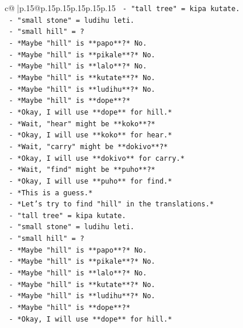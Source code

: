 \documentclass{article}
\begin{document}
{\begin{supertabular}{c@{$\;$}|p{.15\linewidth}@{}p{.15\linewidth}p{.15\linewidth}p{.15\linewidth}p{.15\linewidth}p{.15\linewidth}}
{{{\texttt{       {-} "tall tree" = kipa kutate.} \\
\texttt{       {-} "small stone" = ludihu leti.} \\
\texttt{       {-} "small hill" = ?} \\
\texttt{       {-} *Maybe "hill" is **papo**?* No.} \\
\texttt{       {-} *Maybe "hill" is **pikale**?* No.} \\
\texttt{       {-} *Maybe "hill" is **lalo**?* No.} \\
\texttt{       {-} *Maybe "hill" is **kutate**?* No.} \\
\texttt{       {-} *Maybe "hill" is **ludihu**?* No.} \\
\texttt{       {-} *Maybe "hill" is **dope**?*} \\
\texttt{       {-} *Okay, I will use **dope** for hill.*} \\
\texttt{       {-} *Wait, "hear" might be **koko**?*} \\
\texttt{       {-} *Okay, I will use **koko** for hear.*} \\
\texttt{       {-} *Wait, "carry" might be **dokivo**?*} \\
\texttt{       {-} *Okay, I will use **dokivo** for carry.*} \\
\texttt{       {-} *Wait, "find" might be **puho**?*} \\
\texttt{       {-} *Okay, I will use **puho** for find.*} \\
\texttt{       {-} *This is a guess.*} \\
\texttt{       {-} *Let's try to find "hill" in the translations.*} \\
\texttt{       {-} "tall tree" = kipa kutate.} \\
\texttt{       {-} "small stone" = ludihu leti.} \\
\texttt{       {-} "small hill" = ?} \\
\texttt{       {-} *Maybe "hill" is **papo**?* No.} \\
\texttt{       {-} *Maybe "hill" is **pikale**?* No.} \\
\texttt{       {-} *Maybe "hill" is **lalo**?* No.} \\
\texttt{       {-} *Maybe "hill" is **kutate**?* No.} \\
\texttt{       {-} *Maybe "hill" is **ludihu**?* No.} \\
\texttt{       {-} *Maybe "hill" is **dope**?*} \\
\texttt{       {-} *Okay, I will use **dope** for hill.*} \\
}}}
\end{supertabular}}
\end{document}
